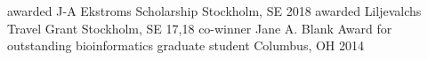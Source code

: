 \begin{cvhonors}
  \cvhonor
    {awarded}
    {J-A Ekstroms Scholarship}
    {Stockholm, SE}
    {2018}
  \cvhonor
    {awarded}
    {Liljevalchs Travel Grant}
    {Stockholm, SE}
    {17,18}
  \cvhonor
    {co-winner}
    {Jane A. Blank Award for outstanding bioinformatics graduate student}
    {Columbus, OH}
    {2014}
\end{cvhonors}

